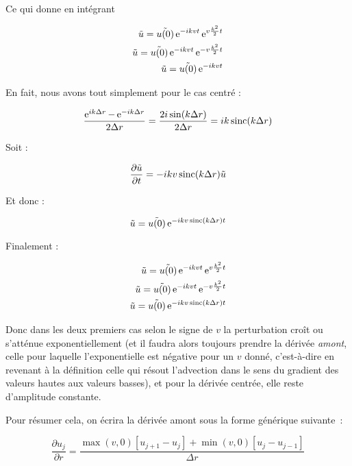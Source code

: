 Ce qui donne en intégrant

\begin{subequations}
    \begin{align}
        \tilde{u} = \tilde{u(0)} \operatorname{e}^{-i k v t} \operatorname{e}^{ v\frac{k^2}{2}t}\\
        \tilde{u} = \tilde{u(0)} \operatorname{e}^{-i k v t} \operatorname{e}^{-v\frac{k^2}{2}t}\\
        \tilde{u} = \tilde{u(0)} \operatorname{e}^{-i k v t}
    \end{align}
\end{subequations}

En fait, nous avons tout simplement pour le cas centré :

\begin{equation}
    \frac{\operatorname{e}^{ik\Delta{r}} - \operatorname{e}^{-ik\Delta{r}}}{2 \Delta{r}} = \frac{2 i \sin(k\Delta{r})}{2 \Delta{r}} = i k \operatorname{sinc}(k\Delta{r})
\end{equation}

Soit :

\begin{equation}
    \frac{\partial \tilde{u}}{\partial t} = - i k v \operatorname{sinc}(k\Delta{r}) \tilde{u}
\end{equation}

Et donc :

\begin{equation}
    \tilde{u} = \tilde{u(0)} \operatorname{e}^{-i k v \operatorname{sinc}(k \Delta{r}) t}
\end{equation}

Finalement :

\begin{subequations}
    \begin{align}
        \tilde{u} = \tilde{u(0)} \operatorname{e}^{-i k v t} \operatorname{e}^{ v\frac{k^2}{2}t}\\
        \tilde{u} = \tilde{u(0)} \operatorname{e}^{-i k v t} \operatorname{e}^{-v\frac{k^2}{2}t}\\
        \tilde{u} = \tilde{u(0)} \operatorname{e}^{-i k v \operatorname{sinc}(k \Delta{r}) t}
    \end{align}
\end{subequations}

Donc dans les deux premiers cas selon le signe de $v$ la perturbation croît ou
s’atténue exponentiellement (et il faudra alors toujours prendre la dérivée
\textit{amont}, celle pour laquelle l’exponentielle est négative pour un $v$
donné, c’est-à-dire en revenant à la définition celle qui résout l’advection
dans le sens du gradient des valeurs hautes aux valeurs basses), et pour la
dérivée centrée, elle reste d’amplitude constante.

Pour résumer cela, on écrira la dérivée amont sous la forme générique suivante :

\begin{equation}
    \frac{\partial u_j}{\partial r} = \frac{\max(v,0) \left[u_{j+1} - u_j \right] + \min(v,0) \left[u_j - u_{j-1}\right]}{\Delta{r}}
\end{equation}


